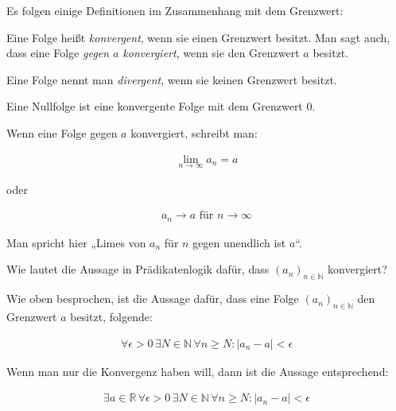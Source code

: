 \documentclass[fontsize=9pt,
               parskip=half-,
               DIV=14,
               listof=chapterentry,
               tocflat]{scrbook}
\begin{document}
Es folgen einige Definitionen im Zusammenhang mit dem Grenzwert:

\begin{description}[style=nextline]
\item[Konvergenz]
Eine Folge heißt \emph{konvergent}, wenn sie einen Grenzwert besitzt. Man sagt auch, dass eine Folge \emph{gegen $a$ konvergiert}, wenn sie den Grenzwert $a$ besitzt.\item[Divergenz]
Eine Folge nennt man \emph{divergent}, wenn sie keinen Grenzwert besitzt.\item[Nullfolge]
Eine Nullfolge ist eine konvergente Folge mit dem Grenzwert $0$.\end{description}

Wenn eine Folge gegen $a$ konvergiert, schreibt man:

\begin{align*}
\lim _{n\to \infty }a_{n}=a
\end{align*}

oder

\begin{align*}
a_{n}\rightarrow a{\text{ für }}n\rightarrow \infty 
\end{align*}

Man spricht hier „Limes von $a_{n}$ für $n$ gegen unendlich ist $a$“.

\begin{mdframed}[style=semanticbox,frametitleaboveskip=3pt,innerbottommargin=3pt,frametitle=Frage]
Wie lautet die Aussage in Prädikatenlogik dafür, dass $(a_{n})_{n\in \mathbb {N} }$ konvergiert?

\end{mdframed}

\begin{answer*}
Wie oben besprochen, ist die Aussage dafür, dass eine Folge $(a_{n})_{n\in \mathbb {N} }$ den Grenzwert $a$ besitzt, folgende:

\begin{align*}
\forall \epsilon >0\,\exists N\in \mathbb {N} \,\forall n\geq N:|a_{n}-a|<\epsilon 
\end{align*}

Wenn man nur die Konvergenz haben will, dann ist die Aussage entsprechend:

\begin{align*}
\exists a\in \mathbb {R} \,\forall \epsilon >0\,\exists N\in \mathbb {N} \,\forall n\geq N:|a_{n}-a|<\epsilon 
\end{align*}

\end{answer*}
\end{document}
